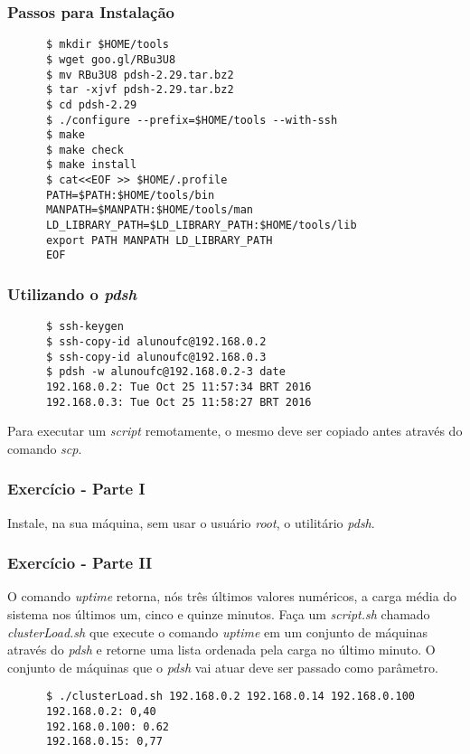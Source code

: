 \documentclass{beamer}
\begin{document}
   \begin{frame}[fragile]
      \frametitle{Passos para Instalação}
      \begin{verbatim}
      $ mkdir $HOME/tools
      $ wget goo.gl/RBu3U8
      $ mv RBu3U8 pdsh-2.29.tar.bz2
      $ tar -xjvf pdsh-2.29.tar.bz2
      $ cd pdsh-2.29
      $ ./configure --prefix=$HOME/tools --with-ssh
      $ make
      $ make check
      $ make install
      $ cat<<EOF >> $HOME/.profile
      PATH=$PATH:$HOME/tools/bin
      MANPATH=$MANPATH:$HOME/tools/man
      LD_LIBRARY_PATH=$LD_LIBRARY_PATH:$HOME/tools/lib
      export PATH MANPATH LD_LIBRARY_PATH
      EOF
      \end{verbatim}
\end{frame}

   \begin{frame}[fragile]
      \frametitle{Utilizando o \textit{pdsh}}
      \begin{verbatim}
      $ ssh-keygen 
      $ ssh-copy-id alunoufc@192.168.0.2
      $ ssh-copy-id alunoufc@192.168.0.3
      $ pdsh -w alunoufc@192.168.0.2-3 date
      192.168.0.2: Tue Oct 25 11:57:34 BRT 2016
      192.168.0.3: Tue Oct 25 11:58:27 BRT 2016
      \end{verbatim}
      Para executar um \textit{script} remotamente, o mesmo deve ser copiado antes através do comando \textit{scp}.
\end{frame}

   \begin{frame}
      \frametitle{Exercício - Parte I}
      Instale, na sua máquina, sem usar o usuário \textit{root}, o utilitário \textit{pdsh}. 
   \end{frame}

   \begin{frame}[fragile]
      \frametitle{Exercício - Parte II}
      O comando \textit{uptime} retorna, nós três últimos valores numéricos, a carga média do sistema nos últimos um, cinco e quinze minutos. Faça um \textit{script.sh} chamado \textit{clusterLoad.sh} que execute o comando \textit{uptime} em um conjunto de máquinas através do \textit{pdsh} e retorne uma lista ordenada pela carga no último minuto. O conjunto de máquinas que o \textit{pdsh} vai atuar deve ser passado como parâmetro. 
      \scriptsize
      \begin{verbatim}
      $ ./clusterLoad.sh 192.168.0.2 192.168.0.14 192.168.0.100
      192.168.0.2: 0,40
      192.168.0.100: 0.62
      192.168.0.15: 0,77
      \end{verbatim}
\end{frame}
\end{document}
